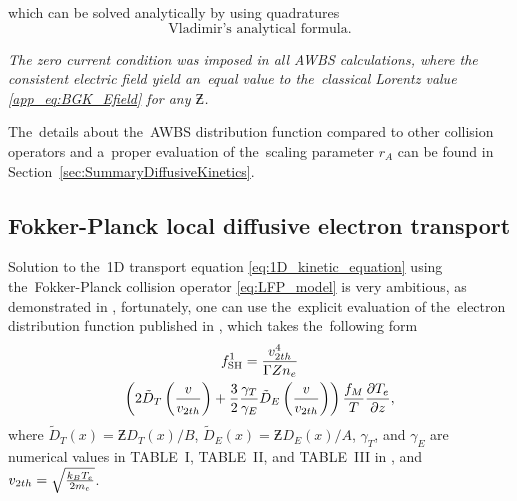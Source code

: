 which can be solved analytically by using quadratures
\begin{equation}
  \text{Vladimir's analytical formula} .
  \label{eq:VT_quadratures}
\end{equation}
 %

\textit{The zero current 
condition was imposed in all AWBS calculations, where
the consistent electric field yield an~equal value to the~classical Lorentz
value \eqref{app_eq:BGK_Efield} for any $\Zbar$.}

The~details about the~AWBS distribution function compared to other
collision operators and a~proper evaluation of the~scaling parameter $r_A$
can be found in Section~\ref{sec:SummaryDiffusiveKinetics}.

\subsection{Fokker-Planck local diffusive electron transport}
\label{sec:FPDiffusiveRegime}

Solution to the~1D transport equation \eqref{eq:1D_kinetic_equation}
using the~Fokker-Planck collision operator \eqref{eq:LFP_model}
is very ambitious, as demonstrated in 
\cite{Chandrasekhar_RMP1943, CSR_1950, Rosenbluth_PR1957}, fortunately, one 
can use the~explicit evaluation of the~electron distribution function
published in \cite{SpitzerHarm_PR1953}, which takes the~following form
\begin{multline}
  \ft^1_{\text{SH}} = %
  \frac{\vtwoh^4}{\Gamma\Zbar n_e}\\
  \left( 2\tilde{D}_T\left(\frac{\vmag}{\vtwoh}\right) 
  + \frac{3}{2}\frac{\gamma_T}{\gamma_E} 
  \tilde{D}_E\left(\frac{\vmag}{\vtwoh}\right) \right)%
  \frac{\fM}{T}\pdv{T_e}{z}  ,
  \label{eq:f1_SH}
\end{multline}
where $\tilde{D}_T(x) = \Zbar D_{T}(x) / B$, 
$\tilde{D}_E(x) = \Zbar D_{E}(x) / A$, $\gamma_T$,
and $\gamma_E$ are numerical values in TABLE~I, TABLE~II, and
TABLE~III in \cite{SpitzerHarm_PR1953}, and 
$v_{2 th} = \sqrt{\frac{k_B T_e}{2m_e}}$.

